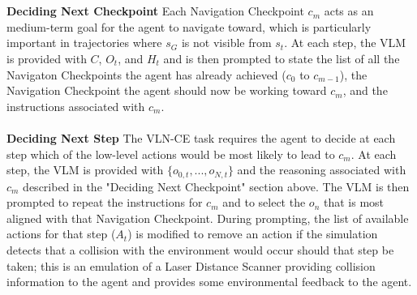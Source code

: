 \documentclass{svproc}
\begin{document}
    \\ \\
    \textbf{Deciding Next Checkpoint}  Each Navigation Checkpoint $c_m$ acts as an medium-term goal for the agent to navigate toward, which is particularly important in trajectories where $s_G$ is not visible from $s_t$. At each step, the VLM is provided with $C$, $O_t$, and $H_t$ and is then prompted to state the list of all the Navigaton Checkpoints the agent has already achieved ($c_0$ to $c_{m-1}$), the Navigation Checkpoint the agent should now be working toward $c_m$, and the instructions associated with $c_m$.
    \\ \\
    \textbf{Deciding Next Step}  The VLN-CE task requires the agent to decide at each step which of the low-level actions would be most likely to lead to $c_m$. At each step, the VLM is provided with $\{o_{0,t}, ..., o_{N,t}\}$ and the reasoning associated with $c_m$ described in the "Deciding Next Checkpoint" section above. The VLM is then prompted to repeat the instructions for $c_m$ and to select the $o_n$ that is most aligned with that Navigation Checkpoint. During prompting, the list of available actions for that step ($A_t$) is modified to remove an action if the simulation detects that a collision with the environment would occur should that step be taken; this is an emulation of a Laser Distance Scanner providing collision information to the agent and provides some environmental feedback to the agent.
\end{document}
